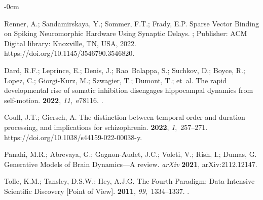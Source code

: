 \documentclass[brainsci, %
               review,accept,pdftex,moreauthors
               ]{Definitions/mdpi}
\begin{document}
\begin{adjustwidth}{-\extralength}{0cm}
\begin{thebibliography}{999}
Renner, A.; Sandamirskaya, Y.; Sommer, F.T.; Frady, E.P.
\newblock Sparse {Vector} {Binding} on {Spiking} {Neuromorphic} {Hardware}
  {Using} {Synaptic} {Delays}.
;
  Publisher: ACM Digital
  library: Knoxville, TN, USA, 2022. {{https://doi.org/10.1145/3546790.3546820}}.

Dard, R.F.; Leprince, E.; Denis, J.; Rao~Balappa, S.; Suchkov, D.; Boyce, R.;
  Lopez, C.; Giorgi-Kurz, M.; Szwagier, T.; Dumont, T.;  et~al.
\newblock The rapid developmental rise of somatic inhibition disengages
  hippocampal dynamics from self-motion.
 {\bf 2022}, {\em 11},~e78116.
.

Coull, J.T.; Giersch, A.
\newblock The distinction between temporal order and duration processing, and
  implications for schizophrenia.
 {\bf 2022}, {\em 1},~257--271.
  {{https://doi.org/10.1038/s44159-022-00038-y}}.

Panahi, M.R.; Abrevaya, G.; Gagnon-Audet, J.C.; Voleti, V.; Rish, I.; Dumas, G.
\newblock Generative {Models} of {Brain} {Dynamics}---{A} review. \emph{arXiv} \textbf{2021},
\newblock arXiv:2112.12147.

Tolle, K.M.; Tansley, D.S.W.; Hey, A.J.G.
\newblock The {Fourth} {Paradigm}: {Data}-{Intensive} {Scientific} {Discovery}
  [{Point} of {View}].
 {\bf 2011}, {\em 99},~1334--1337.
.

\end{thebibliography}



\PublishersNote{}
\end{adjustwidth}
\end{document}
